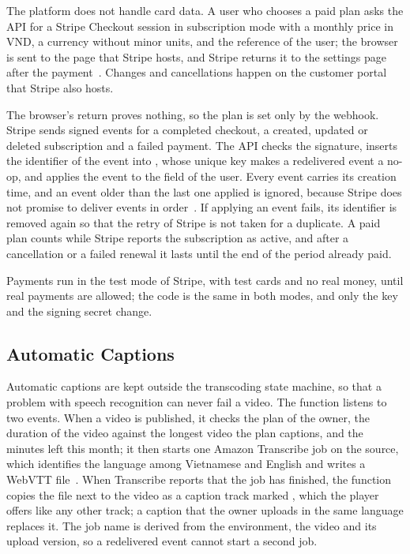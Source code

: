 The platform does not handle card data. A user who chooses a paid plan asks the API for a Stripe
Checkout session in subscription mode with a monthly price in VND, a currency without minor units,
and the reference of the user; the browser is sent to the page that Stripe hosts, and Stripe returns
it to the settings page after the payment~\cite{stripecheckout}. Changes and cancellations happen on
the customer portal that Stripe also hosts.

The browser's return proves nothing, so the plan is set only by the webhook. Stripe sends signed
events for a completed checkout, a created, updated or deleted subscription and a failed payment.
The API checks the signature, inserts the identifier of the event into , whose
unique key makes a redelivered event a no-op, and applies the event to the  field of the
user. Every event carries its creation time, and an event older than the last one applied is ignored,
because Stripe does not promise to deliver events in order~\cite{stripewebhooks}. If applying an
event fails, its identifier is removed again so that the retry of Stripe is not taken for a
duplicate. A paid plan counts while Stripe reports the subscription as active, and after a
cancellation or a failed renewal it lasts until the end of the period already paid.

Payments run in the test mode of Stripe, with test cards and no real money, until real payments are
allowed; the code is the same in both modes, and only the key and the signing secret change.

\subsection{Automatic Captions}
\label{sec:captions-design}

Automatic captions are kept outside the transcoding state machine, so that a problem with speech
recognition can never fail a video. The  function listens to two events. When a video
is published, it checks the plan of the owner, the duration of the video against the longest video
the plan captions, and the minutes left this month; it then starts one Amazon Transcribe job on the
source, which identifies the language among Vietnamese and English and writes a WebVTT
file~\cite{awstranscribe}. When Transcribe reports that the job has finished, the function copies the
file next to the video as a caption track marked , which the player offers like any other
track; a caption that the owner uploads in the same language replaces it. The job name is derived
from the environment, the video and its upload version, so a redelivered event cannot start a second
job.

